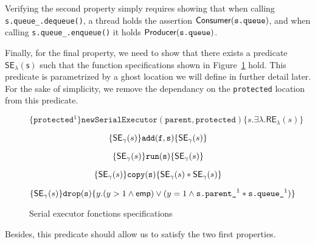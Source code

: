 Verifying the second property simply requires showing that when calling \texttt{s.queue\_.dequeue()}, a thread holds the assertion $\mathsf{Consumer}(\texttt{s.queue})$, and when calling \texttt{s.queue\_.enqueue()} it holds $\mathsf{Producer}(\texttt{s.queue})$.

Finally, for the final property, we need to show that there exists a predicate $\mathsf{SE_{\lambda}(s)}$ such that the function specifications shown in Figure~\ref{fig:seFctSpec} hold. This predicate is parametrized by a ghost location we will define in further detail later. For the sake of simplicity, we remove the dependancy on the \texttt{protected} location from this predicate.

\begin{figure}
\[
		\{\texttt{protected}^1\} \mathtt{newSerialExecutor(parent, protected)} \{s. \exists \lambda. \mathsf{RE}_\lambda (s)\}
\]

\[
		\{\mathsf{SE}_\gamma(s)\} \mathtt{add(f, s)} \{\mathsf{SE}_\gamma(s)\}				
\]

\[
	\{\mathsf{SE}_\gamma(s)\} \mathtt{run(s)} \{\mathsf{SE}_\gamma(s)\}
\]

\[
	\{\mathsf{SE}_\gamma(s)\} \mathtt{copy(s)} \{\mathsf{SE}_\gamma(s) * \mathsf{SE}_\gamma(s)\}
\]

\[
		\{\mathsf{SE}_\gamma(s)\} \mathtt{drop(s)} \{y. (y > 1 \land \mathsf{emp}) \lor (y = 1 \land \texttt{s.parent\_}^1 * \texttt{s.queue\_}^1) \}
\]

		\caption{Serial executor fonctions specifications}
		\label{fig:seFctSpec}
\end{figure}

Besides, this predicate should allow us to satisfy the two first properties.
